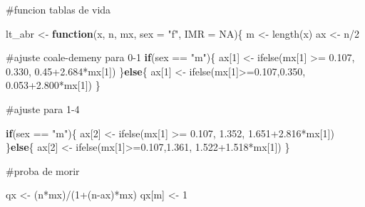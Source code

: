 \documentclass[
  letterpaper,
  DIV=11,
  numbers=noendperiod]{scrartcl}
\newenvironment{Shaded}{\begin{snugshade}}{\end{snugshade}}
\newcommand{\AttributeTok}[1]{\textcolor[rgb]{0.40,0.45,0.13}{#1}}
\newcommand{\CommentTok}[1]{\textcolor[rgb]{0.37,0.37,0.37}{#1}}
\newcommand{\ConstantTok}[1]{\textcolor[rgb]{0.56,0.35,0.01}{#1}}
\newcommand{\ControlFlowTok}[1]{\textcolor[rgb]{0.00,0.23,0.31}{\textbf{#1}}}
\newcommand{\DecValTok}[1]{\textcolor[rgb]{0.68,0.00,0.00}{#1}}
\newcommand{\FloatTok}[1]{\textcolor[rgb]{0.68,0.00,0.00}{#1}}
\newcommand{\FunctionTok}[1]{\textcolor[rgb]{0.28,0.35,0.67}{#1}}
\newcommand{\NormalTok}[1]{\textcolor[rgb]{0.00,0.23,0.31}{#1}}
\newcommand{\OtherTok}[1]{\textcolor[rgb]{0.00,0.23,0.31}{#1}}
\newcommand{\SpecialCharTok}[1]{\textcolor[rgb]{0.37,0.37,0.37}{#1}}
\newcommand{\StringTok}[1]{\textcolor[rgb]{0.13,0.47,0.30}{#1}}
\begin{document}
\begin{Shaded}
\begin{Highlighting}[]
\CommentTok{\#funcion tablas de vida}

\NormalTok{lt\_abr }\OtherTok{\textless{}{-}} \ControlFlowTok{function}\NormalTok{(x, n, mx, }\AttributeTok{sex =} \StringTok{"f"}\NormalTok{, }\AttributeTok{IMR =} \ConstantTok{NA}\NormalTok{)\{}
\NormalTok{  m }\OtherTok{\textless{}{-}} \FunctionTok{length}\NormalTok{(x)}
\NormalTok{  ax }\OtherTok{\textless{}{-}}\NormalTok{ n}\SpecialCharTok{/}\DecValTok{2}
  
  \CommentTok{\#ajuste coale{-}demeny para 0{-}1}
  \ControlFlowTok{if}\NormalTok{(sex }\SpecialCharTok{==} \StringTok{"m"}\NormalTok{)\{}
\NormalTok{    ax[}\DecValTok{1}\NormalTok{] }\OtherTok{\textless{}{-}} \FunctionTok{ifelse}\NormalTok{(mx[}\DecValTok{1}\NormalTok{] }\SpecialCharTok{\textgreater{}=} \FloatTok{0.107}\NormalTok{, }\FloatTok{0.330}\NormalTok{, }\FloatTok{0.45+2.684}\SpecialCharTok{*}\NormalTok{mx[}\DecValTok{1}\NormalTok{])}
\NormalTok{  \}}\ControlFlowTok{else}\NormalTok{\{}
\NormalTok{    ax[}\DecValTok{1}\NormalTok{] }\OtherTok{\textless{}{-}} \FunctionTok{ifelse}\NormalTok{(mx[}\DecValTok{1}\NormalTok{]}\SpecialCharTok{\textgreater{}=}\FloatTok{0.107}\NormalTok{,}\FloatTok{0.350}\NormalTok{, }\FloatTok{0.053+2.800}\SpecialCharTok{*}\NormalTok{mx[}\DecValTok{1}\NormalTok{])}
\NormalTok{  \}}
  
  \CommentTok{\#ajuste para 1{-}4}
  
   \ControlFlowTok{if}\NormalTok{(sex }\SpecialCharTok{==} \StringTok{"m"}\NormalTok{)\{}
\NormalTok{    ax[}\DecValTok{2}\NormalTok{] }\OtherTok{\textless{}{-}} \FunctionTok{ifelse}\NormalTok{(mx[}\DecValTok{1}\NormalTok{] }\SpecialCharTok{\textgreater{}=} \FloatTok{0.107}\NormalTok{, }\FloatTok{1.352}\NormalTok{, }\FloatTok{1.651+2.816}\SpecialCharTok{*}\NormalTok{mx[}\DecValTok{1}\NormalTok{])}
\NormalTok{  \}}\ControlFlowTok{else}\NormalTok{\{}
\NormalTok{    ax[}\DecValTok{2}\NormalTok{] }\OtherTok{\textless{}{-}} \FunctionTok{ifelse}\NormalTok{(mx[}\DecValTok{1}\NormalTok{]}\SpecialCharTok{\textgreater{}=}\FloatTok{0.107}\NormalTok{,}\FloatTok{1.361}\NormalTok{, }\FloatTok{1.522+1.518}\SpecialCharTok{*}\NormalTok{mx[}\DecValTok{1}\NormalTok{])}
\NormalTok{  \} }
  
  \CommentTok{\#proba de morir}
  
\NormalTok{  qx }\OtherTok{\textless{}{-}}\NormalTok{ (n}\SpecialCharTok{*}\NormalTok{mx)}\SpecialCharTok{/}\NormalTok{(}\DecValTok{1}\SpecialCharTok{+}\NormalTok{(n}\SpecialCharTok{{-}}\NormalTok{ax)}\SpecialCharTok{*}\NormalTok{mx)}
\NormalTok{  qx[m] }\OtherTok{\textless{}{-}} \DecValTok{1}
  

\end{Highlighting}
\end{Shaded}
\end{document}
